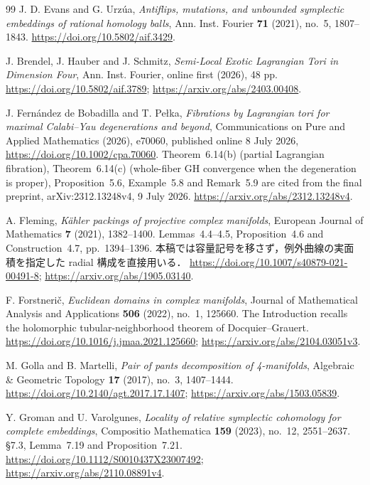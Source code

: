 \begin{thebibliography}{99}
J. D. Evans and G. Urz\'ua,
\emph{Antiflips, mutations, and unbounded symplectic embeddings of rational homology balls},
Ann. Inst. Fourier \textbf{71} (2021), no.~5, 1807--1843.
\url{https://doi.org/10.5802/aif.3429}.

J. Brendel, J. Hauber and J. Schmitz,
\emph{Semi-Local Exotic Lagrangian Tori in Dimension Four},
Ann. Inst. Fourier, online first (2026), 48 pp.
\url{https://doi.org/10.5802/aif.3789};
\url{https://arxiv.org/abs/2403.00408}.

J. Fernández de Bobadilla and T. Pełka,
\emph{Fibrations by Lagrangian tori for maximal Calabi--Yau degenerations and beyond},
Communications on Pure and Applied Mathematics (2026), e70060,
published online 8 July 2026,
\url{https://doi.org/10.1002/cpa.70060}.
Theorem~6.14(b) (partial Lagrangian fibration),
Theorem~6.14(c) (whole-fiber GH convergence when the degeneration is proper),
Proposition~5.6, Example~5.8 and Remark~5.9 are cited from the final preprint,
arXiv:2312.13248v4, 9 July 2026.
\url{https://arxiv.org/abs/2312.13248v4}.

A. Fleming,
\emph{Kähler packings of projective complex manifolds},
European Journal of Mathematics \textbf{7} (2021), 1382--1400.
Lemmas~4.4--4.5, Proposition~4.6 and Construction~4.7, pp.~1394--1396.
本稿では容量記号を移さず，例外曲線の実面積を指定した radial 構成を直接用いる．
\url{https://doi.org/10.1007/s40879-021-00491-8};
\url{https://arxiv.org/abs/1905.03140}.

F. Forstnerič,
\emph{Euclidean domains in complex manifolds},
Journal of Mathematical Analysis and Applications \textbf{506} (2022), no.~1, 125660.
The Introduction recalls the holomorphic tubular-neighborhood theorem of Docquier--Grauert.
\url{https://doi.org/10.1016/j.jmaa.2021.125660};
\url{https://arxiv.org/abs/2104.03051v3}.

M. Golla and B. Martelli,
\emph{Pair of pants decomposition of 4-manifolds},
Algebraic \& Geometric Topology \textbf{17} (2017), no.~3, 1407--1444.
\url{https://doi.org/10.2140/agt.2017.17.1407};
\url{https://arxiv.org/abs/1503.05839}.

Y. Groman and U. Varolgunes,
\emph{Locality of relative symplectic cohomology for complete embeddings},
Compositio Mathematica \textbf{159} (2023), no.~12, 2551--2637.
\S7.3, Lemma~7.19 and Proposition~7.21.
\url{https://doi.org/10.1112/S0010437X23007492};
\url{https://arxiv.org/abs/2110.08891v4}.


\end{thebibliography}
